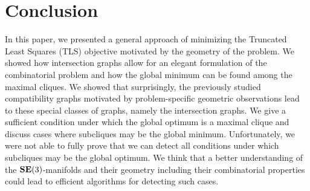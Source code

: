 
\section{Conclusion}
\label{sec:conclusion}

In this paper, we presented a general approach of minimizing the Truncated Least Squares (TLS) objective motivated by the geometry of the problem. We showed how intersection graphs allow for an elegant formulation of the combinatorial problem and how the global minimum can be found among the maximal cliques. We showed that surprisingly, the previously studied compatibility graphs motivated by problem-specific geometric observations lead to these special classes of graphs, namely the intersection graphs. 
We give a sufficient condition under which the global optimum is a maximal clique and discuss cases where subcliques may be the global minimum.
Unfortunately, we were not able to fully prove that we can detect all conditions under which subcliques may be the global optimum.
We think that a better understanding of the $\mathbf{SE(\textrm{3})}$-manifolds and their geometry including their combinatorial properties could lead to efficient algorithms for detecting such cases.

